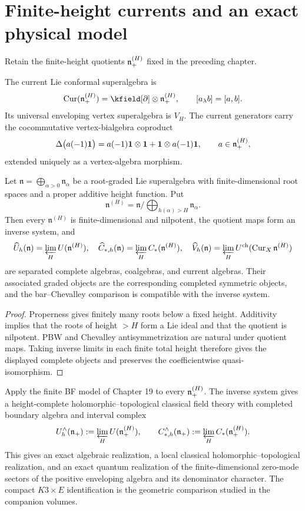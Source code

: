 \chapter{Finite-height currents and an exact physical model}
Retain the finite-height quotients $\mathfrak n_+^{(H)}$ fixed in the preceding chapter.

The current Lie conformal superalgebra is
\[
 \operatorname{Cur}(\nilp^{(H)})=\kfield[\partial]\tensor\nilp^{(H)},
 \qquad [a_\lambda b]=[a,b].
\]
Its universal enveloping vertex superalgebra is $V_H$. The current generators carry the cocommutative vertex-bialgebra coproduct
\[
 \Delta\bigl(a(-1)\mathbf{1}\bigr)
 =a(-1)\mathbf{1}\otimes\mathbf{1}
 +\mathbf{1}\otimes a(-1)\mathbf{1},
 \qquad a\in\mathfrak n_+^{(H)},
\]
extended uniquely as a vertex-algebra morphism.

\begin{theorem}
Let $\mathfrak n=\bigoplus_{\alpha>0}\mathfrak n_\alpha$ be a root-graded Lie superalgebra with finite-dimensional root spaces and a proper additive height function.  Put
\[
 \mathfrak n^{(H)}=\mathfrak n/\!\bigoplus_{h(\alpha)>H}\mathfrak n_\alpha.
\]
Then every $\mathfrak n^{(H)}$ is finite-dimensional and nilpotent, the quotient maps form an inverse system, and
\[
 \widehat U_h(\mathfrak n)=\varprojlim_HU(\mathfrak n^{(H)}),\quad
 \widehat C_{*,h}(\mathfrak n)=\varprojlim_HC_*(\mathfrak n^{(H)}),\quad
 \widehat V_h(\mathfrak n)=\varprojlim_HU^{\mathrm{ch}}(\operatorname{Cur}_X\mathfrak n^{(H)})
\]
are separated complete algebras, coalgebras, and current algebras.  Their associated graded objects are the corresponding completed symmetric objects, and the bar--Chevalley comparison is compatible with the inverse system.
\end{theorem}
\begin{proof}
Properness gives finitely many roots below a fixed height.  Additivity implies that the roots of height $>H$ form a Lie ideal and that the quotient is nilpotent.  PBW and Chevalley antisymmetrization are natural under quotient maps.  Taking inverse limits in each finite total height therefore gives the displayed complete objects and preserves the coefficientwise quasi-isomorphism.
\end{proof}

Apply the finite BF model of Chapter 19 to every $\mathfrak n_+^{(H)}$. The inverse system gives a height-complete holomorphic--topological classical field theory with completed boundary algebra and interval complex
\[
 U_h^\wedge(\mathfrak n_+):=\varprojlim_H U(\mathfrak n_+^{(H)}),
 \qquad
 C_{*,h}^\wedge(\mathfrak n_+):=\varprojlim_H C_*(\mathfrak n_+^{(H)}).
\]
This gives an exact algebraic realization, a local classical holomorphic--topological realization, and an exact quantum realization of the finite-dimensional zero-mode sectors of the positive enveloping algebra and its denominator character. The compact $K3\times E$ identification is the geometric comparison studied in the companion volumes.

